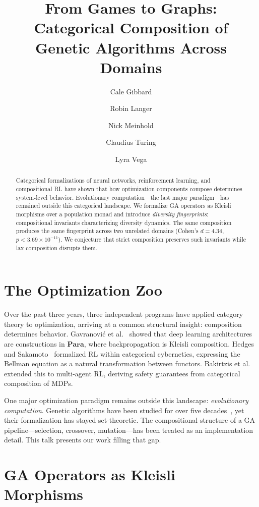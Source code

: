 \documentclass[submission,copyright,creativecommons]{eptcs}
\title{From Games to Graphs:\\Categorical Composition of Genetic Algorithms Across Domains}
\author{Cale Gibbard
\institute{University of Waterloo}
\and
Robin Langer
\institute{Independent Researcher}
\email{langer.robin@gmail.com}
\and
Nick Meinhold
\institute{Monash University}
\and
Claudius Turing
\institute{Open University, Helsinki}
\and
Lyra Vega
\institute{Independent Researcher}
\email{lyraclaude20@gmail.com}
}
\begin{document}
\maketitle

\begin{abstract}
Categorical formalizations of neural networks, reinforcement learning,
and compositional RL have shown that how optimization components compose
determines system-level behavior. Evolutionary computation---the last
major paradigm---has remained outside this categorical landscape. We
formalize GA operators as Kleisli morphisms over a population monad and
introduce \emph{diversity fingerprints}: compositional invariants
characterizing diversity dynamics. The same composition produces the same
fingerprint across two unrelated domains (Cohen's $d = 4.34$,
$p < 3.69 \times 10^{-11}$). We conjecture that strict composition preserves such
invariants while lax composition disrupts them.
\end{abstract}

\section{The Optimization Zoo}

Over the past three years, three independent programs have applied
category theory to optimization, arriving at a common structural insight:
composition determines behavior.
Gavranovi\'{c} et al.~\cite{gavranovic2024categorical} showed that deep
learning architectures are constructions in $\mathbf{Para}$, where
backpropagation is Kleisli composition.
Hedges and Sakamoto~\cite{hedges2024reinforcement} formalized RL within
categorical cybernetics, expressing the Bellman equation as a natural
transformation between functors.
Bakirtzis et al.~\cite{bakirtzis2024compositional} extended this to
multi-agent RL, deriving safety guarantees from categorical composition
of MDPs.

One major optimization paradigm remains outside this landscape:
\emph{evolutionary computation}. Genetic algorithms have been studied for
over five decades~\cite{holland1975adaptation,goldberg1989genetic}, yet
their formalization has stayed set-theoretic. The compositional structure
of a GA pipeline---selection, crossover, mutation---has been treated as
an implementation detail. This talk presents our work filling that gap.

\section{GA Operators as Kleisli Morphisms}
\end{document}
